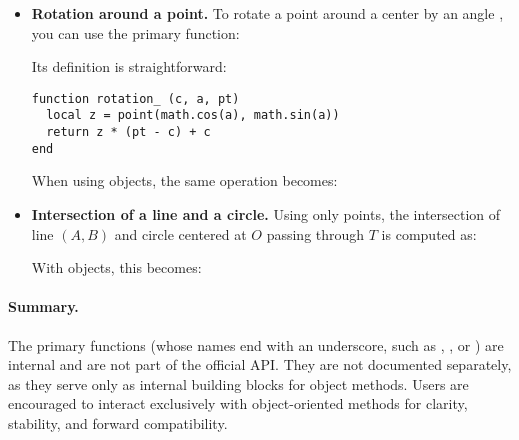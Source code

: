 \begin{itemize}
  \item \textbf{Rotation around a point.}
  To rotate a point  around a center  by an angle , you can use the primary function:
  \begin{center}
  \end{center}

  Its definition is straightforward:

  \begin{center}
  \begin{minipage}{0.6\textwidth}
  \begin{mybox}
  \begin{verbatim}
function rotation_ (c, a, pt)
  local z = point(math.cos(a), math.sin(a))
  return z * (pt - c) + c
end
  \end{verbatim}
  \end{mybox}
  \end{minipage}
  \end{center}

  When using objects, the same operation becomes:
  \begin{center}
  \end{center}

  \item \textbf{Intersection of a line and a circle.}
  Using only points, the intersection of line $(A,B)$ and circle centered at $O$ passing through $T$ is computed as:
  \begin{center}
  \end{center}

  With objects, this becomes:
  \begin{center}
  \end{center}
\end{itemize}

\vspace{1em}
\paragraph{Summary.}

The primary functions (whose names end with an underscore, such as , , or ) are internal and are not part of the official API. They are not documented separately, as they serve only as internal building blocks for object methods. Users are encouraged to interact exclusively with object-oriented methods for clarity, stability, and forward compatibility.
\endinput